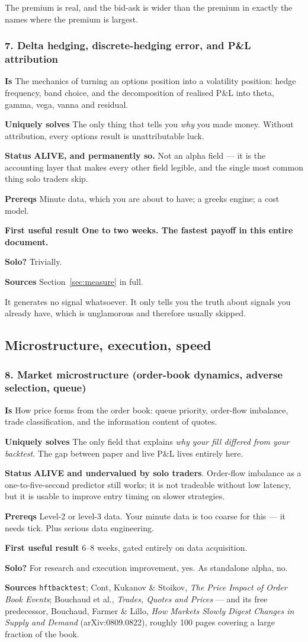 \documentclass[11pt,a4paper]{article}
\newcommand{\alv}[1]{\textcolor{alive}{\textbf{#1}}}
\newcommand{\fitem}[1]{\par\smallskip\noindent\textbf{#1} }
\begin{document}
\begin{waste}
The premium is real, and the bid-ask is wider than the premium in exactly the
names where the premium is largest.
\end{waste}

\subsubsection{7. Delta hedging, discrete-hedging error, and P\&L attribution}
\fitem{Is}The mechanics of turning an options position into a volatility
position: hedge frequency, band choice, and the decomposition of realised P\&L
into theta, gamma, vega, vanna and residual.
\fitem{Uniquely solves}The only thing that tells you \emph{why} you made money.
Without attribution, every options result is unattributable luck.
\fitem{Status}\alv{ALIVE, and permanently so.} Not an alpha field --- it is the
accounting layer that makes every other field legible, and the single most common
thing solo traders skip.
\fitem{Prereqs}Minute data, which you are about to have; a greeks engine; a cost
model.
\fitem{First useful result}\textbf{One to two weeks. The fastest payoff in this
entire document.}
\fitem{Solo?}Trivially.
\fitem{Sources}Section~\ref{sec:measure} in full.

\begin{waste}
It generates no signal whatsoever. It only tells you the truth about signals you
already have, which is unglamorous and therefore usually skipped.
\end{waste}

\subsection{Microstructure, execution, speed}

\subsubsection{8. Market microstructure (order-book dynamics, adverse selection, queue)}
\fitem{Is}How price forms from the order book: queue priority, order-flow
imbalance, trade classification, and the information content of quotes.
\fitem{Uniquely solves}The only field that explains \emph{why your fill differed
from your backtest}. The gap between paper and live P\&L lives entirely here.
\fitem{Status}\alv{ALIVE and undervalued by solo traders}. Order-flow imbalance
as a one-to-five-second predictor still works; it is not tradeable without low
latency, but it is usable to improve entry timing on slower strategies.
\fitem{Prereqs}Level-2 or level-3 data. Your minute data is too coarse for this
--- it needs tick. Plus serious data engineering.
\fitem{First useful result}6--8 weeks, gated entirely on data acquisition.
\fitem{Solo?}For research and execution improvement, yes. As standalone alpha, no.
\fitem{Sources}\texttt{hftbacktest}; Cont, Kukanov \& Stoikov, \emph{The Price
Impact of Order Book Events}; Bouchaud et al., \emph{Trades, Quotes and Prices}
--- and its free predecessor, Bouchaud, Farmer \& Lillo, \emph{How Markets Slowly
Digest Changes in Supply and Demand} (arXiv:0809.0822), roughly 100 pages
covering a large fraction of the book.
\end{document}
